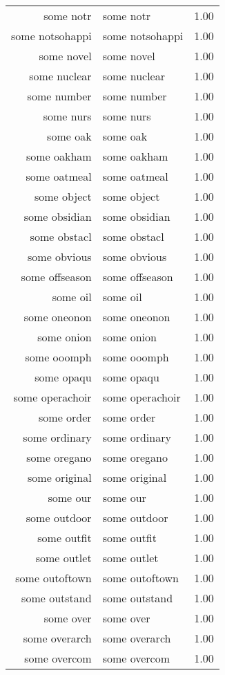 \begin{table}[ht]
\begin{tabular}{rlr}
  some notr & some notr & 1.00 \\ 
  some notsohappi & some notsohappi & 1.00 \\ 
  some novel & some novel & 1.00 \\ 
  some nuclear & some nuclear & 1.00 \\ 
  some number & some number & 1.00 \\ 
  some nurs & some nurs & 1.00 \\ 
  some oak & some oak & 1.00 \\ 
  some oakham & some oakham & 1.00 \\ 
  some oatmeal & some oatmeal & 1.00 \\ 
  some object & some object & 1.00 \\ 
  some obsidian & some obsidian & 1.00 \\ 
  some obstacl & some obstacl & 1.00 \\ 
  some obvious & some obvious & 1.00 \\ 
  some offseason & some offseason & 1.00 \\ 
  some oil & some oil & 1.00 \\ 
  some oneonon & some oneonon & 1.00 \\ 
  some onion & some onion & 1.00 \\ 
  some ooomph & some ooomph & 1.00 \\ 
  some opaqu & some opaqu & 1.00 \\ 
  some operachoir & some operachoir & 1.00 \\ 
  some order & some order & 1.00 \\ 
  some ordinary & some ordinary & 1.00 \\ 
  some oregano & some oregano & 1.00 \\ 
  some original & some original & 1.00 \\ 
  some our & some our & 1.00 \\ 
  some outdoor & some outdoor & 1.00 \\ 
  some outfit & some outfit & 1.00 \\ 
  some outlet & some outlet & 1.00 \\ 
  some outoftown & some outoftown & 1.00 \\ 
  some outstand & some outstand & 1.00 \\ 
  some over & some over & 1.00 \\ 
  some overarch & some overarch & 1.00 \\ 
  some overcom & some overcom & 1.00 \\ 

\end{tabular}
\end{table}

